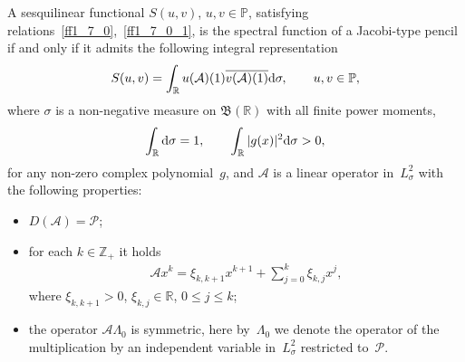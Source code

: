 \begin{Theorem}\label{tt2_1}A sesquilinear functional $S(u,v)$, $u,v\in\mathbb{P}$, satisfying relations~\eqref{ff1_7_0},~\eqref{ff1_7_0_1}, is the spectral function of a Jacobi-type pencil if and only if it admits the following integral representation
\begin{gather}\label{ff2_5}
S(u,v) = \int_{\mathbb{R}} u(\mathcal{A})(1) \overline{ v(\mathcal{A})(1) } {\rm d}\sigma,\qquad u,v\in\mathbb{P},
\end{gather}
where $\sigma$ is a non-negative measure on $\mathfrak{B}(\mathbb{R})$ with all finite power moments,
\begin{gather*} \int_\mathbb{R} {\rm d}\sigma = 1, \qquad \int_\mathbb{R} |g(x)|^2 {\rm d}\sigma > 0,
\end{gather*} for any non-zero complex polynomial~$g$, and $\mathcal{A}$ is a linear operator in~$L^2_\sigma$ with the following properties:
\begin{itemize}\itemsep=0pt
\item[$(i)$] $D(\mathcal{A}) = \mathcal{P}$;
\item[$(ii)$] for each $k\in\mathbb{Z}_+$ it holds
\begin{gather}\label{ff2_7}
\mathcal{A} x^k = \xi_{k,k+1} x^{k+1} + \sum_{j=0}^k \xi_{k,j} x^j,
\end{gather}
where $\xi_{k,k+1} > 0$, $\xi_{k,j}\in\mathbb{R}$, $0\leq j\leq k$;
\item[$(iii)$] the operator $\mathcal{A} \Lambda_0$ is symmetric, here by~$\Lambda_0$ we denote the operator of the multiplication by an independent variable in~$L^2_\sigma$ restricted to~$\mathcal{P}$.
\end{itemize}
\end{Theorem}
